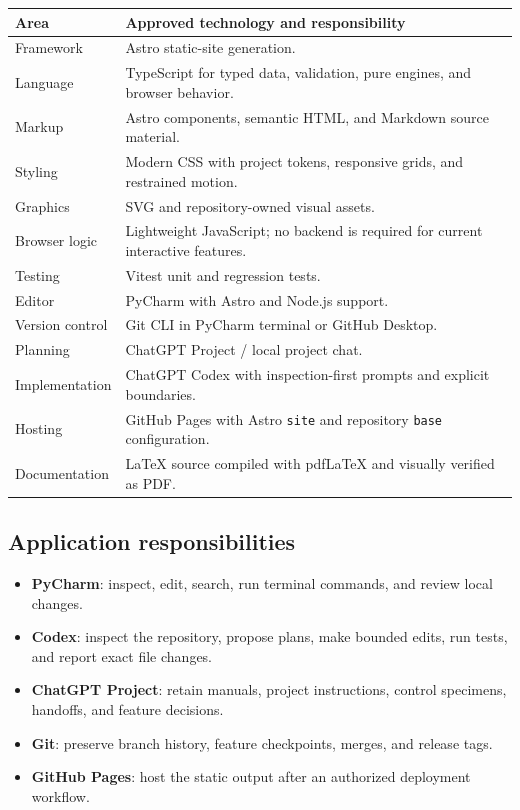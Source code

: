 \documentclass[11pt,letterpaper]{article}
\begin{document}
\begin{tabularx}{\textwidth}{L{1.7in}Y}
\toprule
\textbf{Area} & \textbf{Approved technology and responsibility} \\
\midrule
Framework & Astro static-site generation. \\
Language & TypeScript for typed data, validation, pure engines, and browser behavior. \\
Markup & Astro components, semantic HTML, and Markdown source material. \\
Styling & Modern CSS with project tokens, responsive grids, and restrained motion. \\
Graphics & SVG and repository-owned visual assets. \\
Browser logic & Lightweight JavaScript; no backend is required for current interactive features. \\
Testing & Vitest unit and regression tests. \\
Editor & PyCharm with Astro and Node.js support. \\
Version control & Git CLI in PyCharm terminal or GitHub Desktop. \\
Planning & ChatGPT Project / local project chat. \\
Implementation & ChatGPT Codex with inspection-first prompts and explicit boundaries. \\
Hosting & GitHub Pages with Astro \texttt{site} and repository \texttt{base} configuration. \\
Documentation & LaTeX source compiled with pdfLaTeX and visually verified as PDF. \\
\bottomrule
\end{tabularx}

\subsection{Application responsibilities}

\begin{itemize}
    \item \textbf{PyCharm}: inspect, edit, search, run terminal commands, and
          review local changes.
    \item \textbf{Codex}: inspect the repository, propose plans, make bounded
          edits, run tests, and report exact file changes.
    \item \textbf{ChatGPT Project}: retain manuals, project instructions,
          control specimens, handoffs, and feature decisions.
    \item \textbf{Git}: preserve branch history, feature checkpoints, merges,
          and release tags.
    \item \textbf{GitHub Pages}: host the static output after an authorized
          deployment workflow.
\end{itemize}
\end{document}
